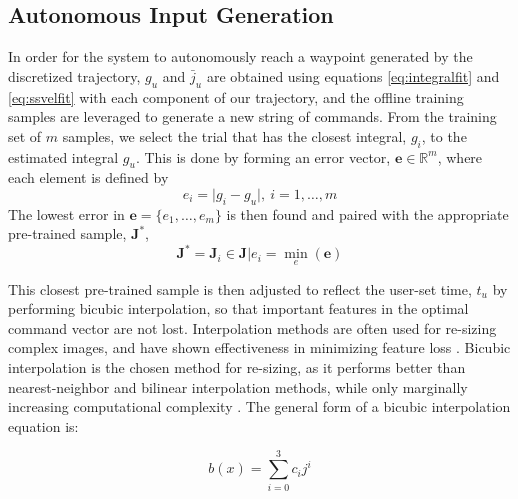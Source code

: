 \documentclass[letterpaper, 10 pt, conference]{ieeeconf}  %
\newcommand\NB[1]{$\spadesuit$\footnote{NB: #1}}
\newcommand{\R}{\mathbb{R}}
\begin{document}
\subsection{Autonomous Input Generation} \label{sec:generate}

In order for the system to autonomously reach a waypoint generated by the discretized trajectory, %
$g_u$ and $\bar{j}_u$ are obtained using equations \eqref{eq:integralfit} and \eqref{eq:ssvelfit} with each component of our trajectory, and the offline training samples are leveraged to generate a new string of commands. From the training set of $m$ samples, we select the trial that has the closest integral, $g_i$, to the estimated integral $g_u$. This is done by forming an error vector, $\bm{e}\in\R^{m}$, where each element is defined by
\begin{equation}
 e_i = \vert g_i-g_u \vert , ~i= 1,\ldots,m
\end{equation}
 The lowest error in $\bm{e} = \{e_1,\ldots,e_m\}$ is then found and paired with the appropriate pre-trained sample, $\bm{J}^*$, %
\begin{equation}
\bm{J}^* = \bm{J}_i \in \bm{J}\vert e_i = \min_e(\bm{e})
\end{equation}

This closest pre-trained sample is then adjusted to reflect the user-set time, $t_u$ by performing bicubic interpolation, so that important features in the optimal command vector are not lost. Interpolation methods are often used for re-sizing complex images, and have shown effectiveness in minimizing feature loss \cite{bicfeatures}. Bicubic interpolation is the chosen method for re-sizing, as it performs better than nearest-neighbor and bilinear interpolation methods, while only marginally increasing computational complexity \cite{biccomp}. The general form of a bicubic interpolation equation is: 

\begin{equation} \label{eq:bicinter}
    b(x) = \sum_{i=0}^3c_ij^i
\end{equation}
\end{document}
